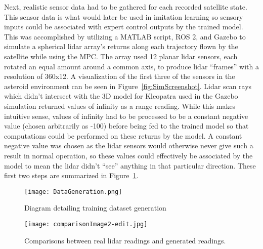 \documentclass[twocolumn,letterpaper]{IEEEAerospaceCLS}
\begin{document}
Next, realistic sensor data had to be gathered for each recorded satellite state. This sensor data is what would later be used in imitation learning so sensory inputs could be associated with expert control outputs by the trained model. This was accomplished by utilizing a MATLAB script, ROS 2, and Gazebo to simulate a spherical lidar array's returns along each trajectory flown by the satellite while using the MPC. The array used 12 planar lidar sensors, each rotated an equal amount around a common axis, to produce lidar ``frames'' with a resolution of 360x12. A visualization of the first three of the sensors in the asteroid environment can be seen in Figure~\ref{fig:SimScreenshot}. Lidar scan rays which didn't intersect with the 3D model for Kleopatra used in the Gazebo simulation returned values of infinity as a range reading. While this makes intuitive sense, values of infinity had to be processed to be a constant negative value (chosen arbitrarily as -100) before being fed to the trained model so that computations could be performed on these returns by the model. A constant negative value was chosen as the lidar sensors would otherwise never give such a result in normal operation, so these values could effectively be associated by the model to mean the lidar didn't ``see'' anything in that particular direction. These first two steps are summarized in Figure~\ref{fig:DataGeneration}. 

\begin{figure}[ht]
    \centering
    \texttt{[image: DataGeneration.png]}
    \caption{Diagram detailing training dataset generation}
    \label{fig:DataGeneration}
\end{figure}

\begin{figure}[ht]
    \centering
    \texttt{[image: comparisonImage2-edit.jpg]}
    \caption{Comparisons between real lidar readings and generated readings.}
    \label{fig:ComparisonImage}
\end{figure}
\end{document}
